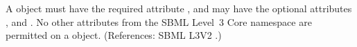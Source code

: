 A \FunctionDefinition object must have the required attribute ,
and may have the optional attributes ,  and
.  No other attributes from the SBML Level~3 Core namespace are
permitted on a \FunctionDefinition object.  (References: SBML L3V2
.)
